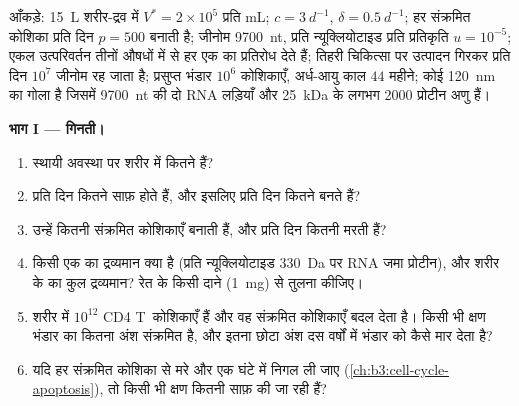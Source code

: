 \begin{problem}
\label{pb:b3:virology:1}
आँकड़े: \qty{15}{L} शरीर-द्रव में  $V^{*} = 2\times 10^{5}$
प्रति mL; $c = \qty{3}{d^{-1}}$, $\delta = \qty{0.5}{d^{-1}}$; हर
संक्रमित कोशिका प्रति दिन $p = 500$  बनाती है; जीनोम
\qty{9700}{nt}, प्रति न्यूक्लियोटाइड प्रति प्रतिकृति $u = 10^{-5}$;
एकल उत्परिवर्तन तीनों औषधों में से हर एक का प्रतिरोध देते हैं; तिहरी
चिकित्सा पर उत्पादन गिरकर प्रति दिन $10^{7}$ जीनोम रह जाता है; प्रसुप्त
भंडार $10^{6}$ कोशिकाएँ, अर्ध-आयु काल $44$ महीने; कोई 
\qty{120}{nm} का गोला है जिसमें \qty{9700}{nt} की दो RNA लड़ियाँ और
\qty{25}{kDa} के लगभग \num{2000} प्रोटीन अणु हैं।

\medskip
\noindent\textbf{भाग I --- गिनती।}
\begin{enumerate}
  \item स्थायी अवस्था पर शरीर में कितने  हैं?
  \item प्रति दिन कितने साफ़ होते हैं, और इसलिए प्रति दिन कितने बनते
        हैं?
  \item उन्हें कितनी संक्रमित कोशिकाएँ बनाती हैं, और प्रति दिन कितनी
        मरती हैं?
  \item किसी एक  का द्रव्यमान क्या है (प्रति न्यूक्लियोटाइड
        \qty{330}{Da} पर RNA जमा प्रोटीन), और शरीर के  का
        कुल द्रव्यमान? रेत के किसी दाने (\qty{1}{mg}) से तुलना कीजिए।
  \item शरीर में $10^{12}$ CD4 T~कोशिकाएँ हैं और वह संक्रमित कोशिकाएँ
        बदल देता है। किसी भी क्षण भंडार का कितना अंश संक्रमित है, और
        इतना छोटा अंश दस वर्षों में भंडार को कैसे मार देता है?
  \item यदि हर संक्रमित कोशिका  से मरे और एक घंटे में निगल
        ली जाए (\cref{ch:b3:cell-cycle-apoptosis}), तो किसी भी क्षण
        कितनी साफ़ की जा रही हैं?
\end{enumerate}


\end{problem}
